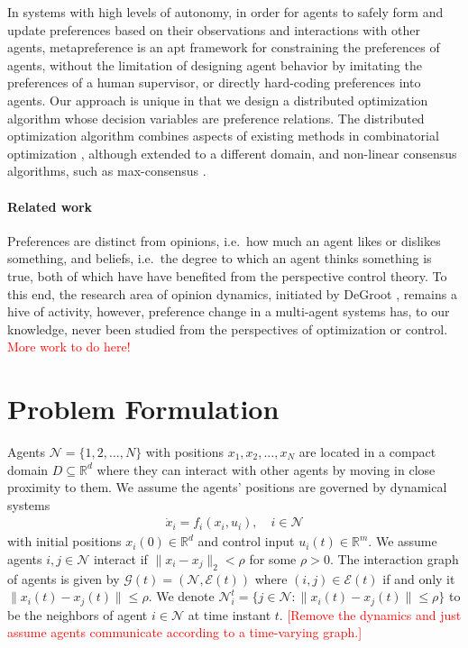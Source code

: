 \documentclass[conference]{ieeeconf}
\newcommand{\R}{\mathbb{R}}
\newcommand{\N}{\mathcal{N}}
\renewcommand{\leq}{\leqslant}
\newcommand{\graph}{\mathcal{G}}
\newcommand{\edges}{\mathcal{E}}
\begin{document}
In systems with high levels of autonomy, in order for agents to safely form and update preferences based on their observations and interactions with other agents, metapreference is an apt framework for constraining the preferences of agents, without the limitation of designing agent behavior by imitating the preferences of a human supervisor, or directly hard-coding preferences into agents. Our approach is unique in that we design a distributed optimization algorithm whose decision variables are preference relations. The distributed optimization algorithm combines aspects of existing methods in combinatorial optimization \cite{?}, although extended to a different domain, and non-linear consensus algorithms, such as max-consensus \cite{?}. 

\paragraph*{Related work}
Preferences are distinct from opinions, i.e.~how much an agent likes or dislikes something, and beliefs, i.e.~the degree to which an agent thinks something is true, both of which have have benefited from the perspective control theory. To this end, the research area of opinion dynamics, initiated by DeGroot \cite{degroot1974}, remains a hive of activity, however, preference change in a multi-agent systems has, to our knowledge, never been studied from the perspectives of optimization or control. \textcolor{red}{More work to do here!}


% 

\section{Problem Formulation}

Agents $\N = \{1,2,\dots, N\}$ with positions $x_1, x_2, \dots, x_N$ are located in a compact domain $D \subseteq \R^d$ where they can interact with other agents by moving in close proximity to them. We assume the agents' positions are governed by dynamical systems
\begin{align}
    \dot{x}_i = f_i(x_i,u_i), \quad i \in \N \label{eq:x-dynamics}
\end{align}
with initial positions $x_i(0) \in \R^d$ and control input $u_i(t) \in \R^m$. We assume agents $i, j \in \N$ interact if $\| x_i - x_j \|_2 < \rho$ for some $\rho>0$. The interaction graph of agents is given by $\graph(t) = \left( \N, \edges(t) \right)$ where $(i,j) \in \mathcal{E}(t)$ if and only it $\| x_i(t) - x_j(t) \| \leq \rho$. We denote $\N_i^t = \{ j \in \N: \| x_i(t) - x_j(t) \| \leqslant \rho \}$ to be the neighbors of agent $i \in \N$ at time instant $t$. \textcolor{red}{[Remove the dynamics and just assume agents communicate according to a time-varying graph.]}
\end{document}
